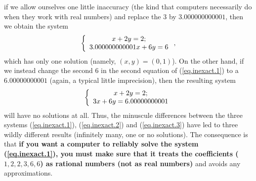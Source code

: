 \documentclass[numbers=enddot,12pt,final,onecolumn,notitlepage]{scrartcl}%
\theoremstyle{definition}
\begin{document}
\begin{itemize}
if we allow ourselves one little inaccuracy (the kind that computers
necessarily do when they work with real numbers) and replace the $3$ by
$3.000000000001$, then we obtain the system%
\begin{equation}
\left\{
\begin{array}
[c]{c}%
x+2y=2;\\
3.000000000001x+6y=6
\end{array}
\right.  , \label{eq.inexact.2}%
\end{equation}
which has only one solution (namely, $\left(  x,y\right)  =\left(  0,1\right)
$). On the other hand, if we instead change the second $6$ in the second
equation of (\ref{eq.inexact.1}) to a $6.00000000001$ (again, a typical little
imprecision), then the resulting system%
\begin{equation}
\left\{
\begin{array}
[c]{c}%
x+2y=2;\\
3x+6y=6.00000000001
\end{array}
\right.  \label{eq.inexact.3}%
\end{equation}
will have no solutions at all. Thus, the minuscule differences between the
three systems (\ref{eq.inexact.1}), (\ref{eq.inexact.2}) and
(\ref{eq.inexact.3}) have led to three wildly different results (infinitely
many, one or no solutions). The consequence is that \textbf{if you want a
computer to reliably solve the system (\ref{eq.inexact.1}), you must make sure
that it treats the coefficients (}$1,2,2,3,6,6$\textbf{) as rational numbers
(not as real numbers)} and avoids any approximations.


\end{itemize}
\end{document}
